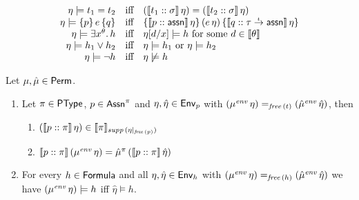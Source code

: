 \documentclass[12pt,a4paper]{report}
\newcommand{\senv}{\nstyle{env}}
\begin{document}
\begin{definition}
\[\begin{array}{rcl}
    \eta \models t_1 = t_2
      &\text{iff}&
      (\llbracket{t_1}\mathrel{::}{\sigma}\rrbracket\,\eta) = (\llbracket{t_2}\mathrel{::}{\sigma}\rrbracket\,\eta) \\
    \eta \models \{p\}\,e\,\{q\}
      &\text{iff}&
      \{\llbracket{p}\mathrel{::}{\mathsf{assn}}\rrbracket\,\eta\}\,(e\,\eta)\,\{\llbracket{q}\mathrel{::}{\tau\stackrel{_t}{\to}\mathsf{assn}}\rrbracket\,\eta\} \\
    \eta \models \exists x^\theta.\,h
      &\text{iff}&
      \eta[d/x] \models h \text{ for some } d \in \llbracket\theta\rrbracket \\
    \eta \models h_1 \vee h_2
      &\text{iff}&
      \eta \models h_1 \text{ or } \eta \models h_2 \\
    \eta \models \neg h
      &\text{iff}&
      \eta \not\models h \\
  \end{array}\]
\end{definition}

\begin{lemma} \label{lemma:meaning_function_of_p_is_well_defined}
  Let $\mu,\hat{\mu}\in\mathsf{Perm}$.
  \begin{enumerate}
    \item Let $\pi \in \mathsf{PType}$, $p \in \mathsf{Assn}^\pi$ and $\eta,\hat{\eta} \in \mathsf{Env}_p$ with
          $(\mu^\senv\,\eta) =_{\free{t}} (\hat{\mu}^\senv\,\hat{\eta})$, then
          \begin{enumerate}
            \item $(\llbracket{p}\mathrel{::}{\pi}\rrbracket\,\eta) \in \llbracket\pi\rrbracket_{\mathit{supp}\,(\eta|_{\mathit{free}\,(p)})}$
            \item $\semantic{\tj{p}{\pi}}\,(\mu^\senv\,\eta) = \hat{\mu}^\pi\,(\semantic{\tj{p}{\pi}}\,\hat{\eta})$
          \end{enumerate}

    \item For every $h \in \mathsf{Formula}$ and all $\eta,\hat{\eta}\in\mathsf{Env}_h$ with 
          $(\mu^\senv\,\eta) =_{\free{h}} (\hat{\mu}^\senv\,\hat{\eta})$ we have
          $(\mu^\senv\,\eta)\models h$ iff $\hat{\eta}\models h$.
  \end{enumerate}
\end{lemma}
\end{document}
